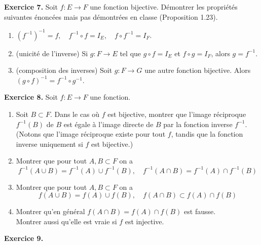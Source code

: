 \documentclass[a4paper, 10pt]{report}
\begin{document}
	\vspace{5mm}
	\noindent
	\textbf{Exercice 7.} Soit $f: E \to F$ une fonction bijective.
	Démontrer les propriétés suivantes énoncées mais pas démontrées
	en classe (Proposition 1.23).
	
	\begin{enumerate}[label=(\roman*)]
		\item $(f^{-1})^{-1} = f, \quad
			f^{-1} \circ f = I_E, \quad
			f \circ f^{-1} = I_F$.
		\item (unicité de l'inverse) Si $g : F \to E$ tel que
		$g \circ f = I_E$ et $f \circ g = I_F$, alors $g = f^{-1}$.
		\item (composition des inverses) Soit $g : F \to G$ une autre
		fonction bijective. Alors
		$(g \circ f)^{-1} = f^{-1} \circ g^{-1}$.
	\end{enumerate}
	
	\vspace{5mm}
	\noindent
	\textbf{Exercice 8.} Soit $f : E \to F$ une fonction.
	
	\begin{enumerate}[label=(\roman*)]
		\item Soit $B \subset F$. Dans le cas où $f$ est bijective,
		montrer que l'image réciproque $f^{-1}(B)$ de $B$ est égale
		à l'image directe de $B$ par la fonction inverse $f^{-1}$.
		(Notons que l'image réciproque existe pour tout $f$, tandis
		que la fonction inverse uniquement si $f$ est bijective.)
		\item Montrer que pour tout $A, B \subset F$ on a
		\[
			f^{-1}(A \cup B) = f^{-1}(A) \cup f^{-1}(B), \quad
			f^{-1}(A \cap B) = f^{-1}(A) \cap f^{-1}(B)
		\]
		\item Montrer que pour tout $A, B \subset F$ on a
		\[
		f(A \cup B) = f(A) \cup f(B), \quad
		f(A \cap B) \subset f(A) \cap f(B)
		\]
		\item Montrer qu'en général $f(A \cap B) = f(A) \cap f(B)$
		est fausse.\\
		Montrer aussi qu'elle est vraie si $f$ est injective.
	\end{enumerate}
	
	\vspace{5mm}
	\noindent
	\textbf{Exercice 9.}
	
\end{document}
